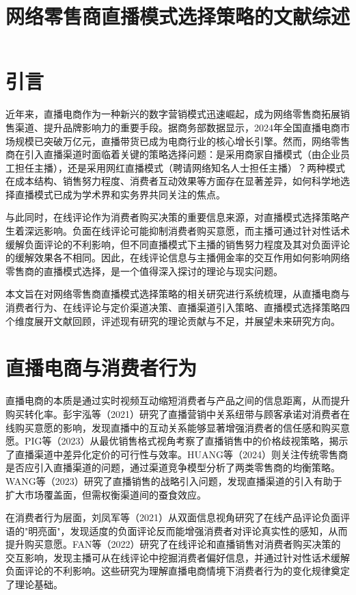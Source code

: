 \documentclass[12pt,a4paper]{article}
\begin{document}
\title{\textbf{网络零售商直播模式选择策略的文献综述}}
\author{}
\date{}
\maketitle

\section{引言}

近年来，直播电商作为一种新兴的数字营销模式迅速崛起，成为网络零售商拓展销售渠道、提升品牌影响力的重要手段。据商务部数据显示，2024年全国直播电商市场规模已突破万亿元，直播带货已成为电商行业的核心增长引擎。然而，网络零售商在引入直播渠道时面临着关键的策略选择问题：是采用商家自播模式（由企业员工担任主播），还是采用网红直播模式（聘请网络知名人士担任主播）？两种模式在成本结构、销售努力程度、消费者互动效果等方面存在显著差异，如何科学地选择直播模式已成为学术界和实务界共同关注的焦点。

与此同时，在线评论作为消费者购买决策的重要信息来源，对直播模式选择策略产生着深远影响。负面在线评论可能抑制消费者购买意愿，而主播可通过针对性话术缓解负面评论的不利影响，但不同直播模式下主播的销售努力程度及其对负面评论的缓解效果各不相同。因此，在线评论信息与主播佣金率的交互作用如何影响网络零售商的直播模式选择，是一个值得深入探讨的理论与现实问题。

本文旨在对网络零售商直播模式选择策略的相关研究进行系统梳理，从直播电商与消费者行为、在线评论与定价渠道决策、直播渠道引入策略、直播模式选择策略四个维度展开文献回顾，评述现有研究的理论贡献与不足，并展望未来研究方向。

\section{直播电商与消费者行为}

直播电商的本质是通过实时视频互动缩短消费者与产品之间的信息距离，从而提升购买转化率。彭宇泓等（2021）研究了直播营销中关系纽带与顾客承诺对消费者在线购买意愿的影响，发现直播中的互动关系能够显著增强消费者的信任感和购买意愿\cite{peng2021}。PIG等（2023）从最优销售格式视角考察了直播销售中的价格歧视策略，揭示了直播渠道中差异化定价的可行性与效率\cite{pig2023}。HUANG等（2024）则关注传统零售商是否应引入直播渠道的问题，通过渠道竞争模型分析了两类零售商的均衡策略\cite{huang2024}。WANG等（2023）研究了直播销售的战略引入问题，发现直播渠道的引入有助于扩大市场覆盖面，但需权衡渠道间的蚕食效应\cite{wang2023}。

在消费者行为层面，刘凤军等（2021）从双面信息视角研究了在线产品评论负面评语的"明亮面"，发现适度的负面评论反而能增强消费者对评论真实性的感知，从而提升购买意愿\cite{liu2021}。FAN等（2022）研究了在线评论和直播销售对消费者购买决策的交互影响，发现主播可从在线评论中挖掘消费者偏好信息，并通过针对性话术缓解负面评论的不利影响\cite{fan2022}。这些研究为理解直播电商情境下消费者行为的变化规律奠定了理论基础。
\end{document}
